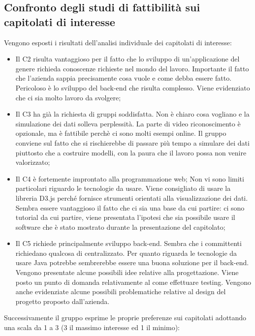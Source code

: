 \documentclass{article}
\begin{document}
\subsection{Confronto degli studi di fattibilità sui capitolati di interesse}%
\label{sub:studi_fattibilita}
Vengono esposti i risultati dell’analisi individuale dei capitolati di interesse:
\begin{itemize}
    \item Il C2 risulta vantaggioso per il fatto che lo sviluppo di un’applicazione del genere richieda conoscenze richieste nel mondo del lavoro. Importante il fatto che l’azienda sappia precisamente cosa vuole e come debba essere fatto. Pericoloso è lo sviluppo del back-end che risulta complesso. Viene evidenziato che ci sia molto lavoro da svolgere;
    \item Il C3 ha già la richiesta di gruppi soddisfatta. Non è chiaro cosa vogliano e la simulazione dei dati solleva perplessità. La parte di video riconoscimento è opzionale, ma è fattibile perchè ci sono molti esempi online. Il gruppo conviene sul fatto che si rischierebbe di passare più tempo a simulare dei dati piuttosto che a costruire modelli, con la paura che il lavoro possa non venire valorizzato;
    \item Il C4 è fortemente improntato alla programmazione web; Non vi sono limiti particolari riguardo le tecnologie da usare. Viene consigliato di usare la libreria D3.js perché fornisce strumenti orientati alla visualizzazione dei dati. Sembra essere vantaggioso il fatto che ci sia una base da cui partire: ci sono tutorial da cui partire, viene presentata l’ipotesi che sia possibile usare il software che è stato mostrato durante la presentazione del capitolato;
    \item Il C5 richiede principalmente sviluppo back-end. Sembra che i committenti richiedano qualcosa di centralizzato. Per quanto riguarda le tecnologie da usare Java potrebbe sembrerebbe essere una buona soluzione per il back-end. Vengono presentate alcune possibili idee relative alla progettazione. Viene posto un punto di domanda relativamente al come effettuare testing. Vengono anche evidenziate alcune possibili problematiche relative al design del progetto proposto dall’azienda.
\end{itemize}

\setlength{\parindent}{0pt}Successivamente il gruppo esprime le proprie preferenze sui capitolati adottando una scala da 1 a 3 (3 il massimo interesse ed 1 il minimo):
\end{document}
